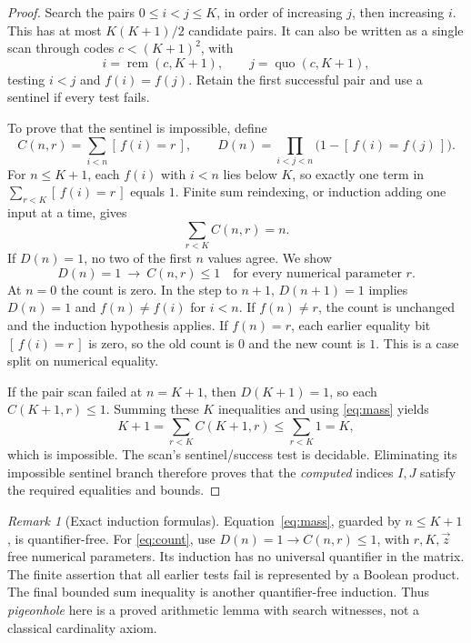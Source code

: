 \documentclass[11pt,letterpaper]{article}
\theoremstyle{definition}
\theoremstyle{remark}
\newtheorem{remark}[theorem]{Remark}
\newcommand{\remd}{\operatorname{rem}}
\newcommand{\quod}{\operatorname{quo}}
\newcommand{\ind}[1]{[\,#1\,]}
\begin{document}
\begin{proof}
Search the pairs \(0\le i<j\le K\), in order of increasing \(j\), then
increasing \(i\). This has at most \(K(K+1)/2\) candidate pairs. It can
also be written as a single scan through codes \(c<(K+1)^2\), with
\[
 i=\remd(c,K+1),\qquad j=\quod(c,K+1),
\]
testing \(i<j\) and \(f(i)=f(j)\). Retain the first successful pair and
use a sentinel if every test fails.

To prove that the sentinel is impossible, define
\[
 C(n,r)=\sum_{i<n}\ind{f(i)=r},\qquad
 D(n)=\prod_{i<j<n}\bigl(1-\ind{f(i)=f(j)}\bigr).
\]
For \(n\le K+1\), each \(f(i)\) with \(i<n\) lies below \(K\), so exactly
one term in \(\sum_{r<K}\ind{f(i)=r}\) equals \(1\). Finite sum
reindexing, or induction adding one input at a time, gives
\begin{equation}
 \sum_{r<K}C(n,r)=n.
 \label{eq:mass}
\end{equation}
If \(D(n)=1\), no two of the first \(n\) values agree. We show
\begin{equation}
 D(n)=1\ \longrightarrow\ C(n,r)\le1
 \quad\text{for every numerical parameter }r.
 \label{eq:count}
\end{equation}
At \(n=0\) the count is zero. In the step to \(n+1\), \(D(n+1)=1\)
implies \(D(n)=1\) and \(f(n)\ne f(i)\) for \(i<n\).
If \(f(n)\ne r\), the count is unchanged and the induction hypothesis
applies. If \(f(n)=r\), each earlier equality bit \(\ind{f(i)=r}\) is zero,
so the old count is \(0\) and the new count is \(1\). This is a case split
on numerical equality.

If the pair scan failed at \(n=K+1\), then \(D(K+1)=1\), so
each \(C(K+1,r)\le1\). Summing these \(K\) inequalities and using
\eqref{eq:mass} yields
\[
 K+1=\sum_{r<K}C(K+1,r)\le\sum_{r<K}1=K,
\]
which is impossible. The scan's sentinel/success test is decidable.
Eliminating its impossible sentinel branch therefore proves that the
\emph{computed} indices \(I,J\) satisfy the required equalities and bounds.
\end{proof}

\begin{remark}[Exact induction formulas]
Equation~\eqref{eq:mass}, guarded by \(n\le K+1\), is quantifier-free.
For \eqref{eq:count}, use
\(D(n)=1\to C(n,r)\le1\), with \(r,K,\vec z\) free numerical parameters.
Its induction has no universal quantifier in the matrix. The finite
assertion that all earlier tests fail is represented by a Boolean
product. The final bounded sum inequality is another quantifier-free
induction. Thus \emph{pigeonhole} here is a proved arithmetic lemma with
search witnesses, not a classical cardinality axiom.
\end{remark}
\end{document}

